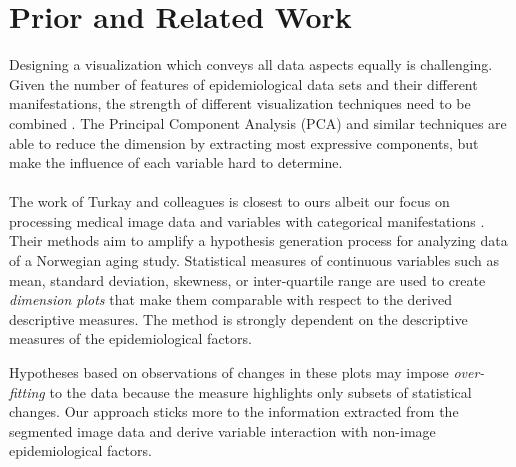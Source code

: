 \documentclass[journal]{style/vgtc} 			          %
\begin{document}
\section{Prior and Related Work}
Designing a visualization which conveys all data aspects equally is challenging.
%
Given the number of features of epidemiological data sets and their different manifestations, the strength of different visualization techniques need to be combined \cite{Buja91, Konyha2009}.
%
The Principal Component Analysis (PCA) and similar techniques are able to reduce the dimension by extracting most expressive components, but make the influence of each variable hard to determine.
\\\\
The work of Turkay and colleagues is closest to ours albeit our focus on processing medical image data and variables with categorical manifestations \cite{Turkay2013}.
%
Their methods aim to amplify a hypothesis generation process for analyzing data of a Norwegian aging study.
%
Statistical measures of continuous variables such as mean, standard deviation, skewness, or inter-quartile range are used to create \emph{dimension plots} that make them comparable with respect to the derived descriptive measures.
%
%
%
%
%
The method is strongly dependent on the descriptive measures of the epidemiological factors.

Hypotheses based on observations of changes in these plots may impose \emph{over-fitting} to the data because the measure highlights only subsets of statistical changes.
%
Our approach sticks more to the information extracted from the segmented image data and derive variable interaction with non-image epidemiological factors.
\end{document}
